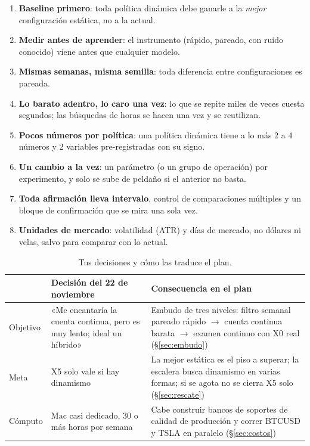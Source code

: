 \documentclass[11pt,a4paper]{article}
\begin{document}
\begin{enumerate}[leftmargin=1.6em]
  \item \textbf{Baseline primero}: toda política dinámica debe ganarle a la \emph{mejor} configuración estática, no a la actual.
  \item \textbf{Medir antes de aprender}: el instrumento (rápido, pareado, con ruido conocido) viene antes que cualquier modelo.
  \item \textbf{Mismas semanas, misma semilla}: toda diferencia entre configuraciones es pareada.
  \item \textbf{Lo barato adentro, lo caro una vez}: lo que se repite miles de veces cuesta segundos; las búsquedas de horas se hacen una vez y se reutilizan.
  \item \textbf{Pocos números por política}: una política dinámica tiene a lo más 2 a 4 números y 2 variables pre-registradas con su signo.
  \item \textbf{Un cambio a la vez}: un parámetro (o un grupo de operación) por experimento, y solo se sube de peldaño si el anterior no basta.
  \item \textbf{Toda afirmación lleva intervalo}, control de comparaciones múltiples y un bloque de confirmación que se mira una sola vez.
  \item \textbf{Unidades de mercado}: volatilidad (ATR) y días de mercado, no dólares ni velas, salvo para comparar con lo actual.
\end{enumerate}

\begin{table}[H]
\centering\small
\begin{tabularx}{\linewidth}{lXX}
\toprule
 & Decisión del 22 de noviembre & Consecuencia en el plan \\
\midrule
Objetivo & «Me encantaría la cuenta continua, pero es muy lento; ideal un híbrido» & Embudo de tres niveles: filtro semanal pareado rápido $\rightarrow$ cuenta continua barata $\rightarrow$ examen continuo con X0 real (§\ref{sec:embudo}) \\
Meta & X5 solo vale si hay dinamismo & La mejor estática es el piso a superar; la escalera busca dinamismo en varias formas; si se agota no se cierra X5 solo (§\ref{sec:rescate}) \\
Cómputo & Mac casi dedicado, 30 o más horas por semana & Cabe construir bancos de soportes de calidad de producción y correr BTCUSD y TSLA en paralelo (§\ref{sec:costos}) \\
\bottomrule
\end{tabularx}
\caption{Tus decisiones y cómo las traduce el plan.}
\end{table}
\end{document}
